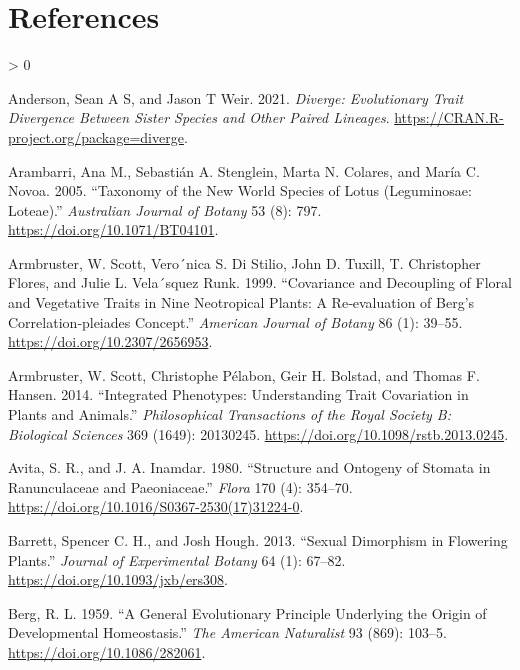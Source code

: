 \documentclass[
  10pt,
]{article}
\newlength{\cslhangindent}
\newenvironment{CSLReferences}[2] %
 {%
  \setlength{\parindent}{0pt}
  \ifodd #1 \everypar{\setlength{\hangindent}{\cslhangindent}}\ignorespaces\fi
  \ifnum #2 > 0
  \setlength{\parskip}{#2\baselineskip}
  \fi
 }%
 {}
\begin{document}
\clearpage

\hypertarget{references}{%
\section*{References}\label{references}}

\hypertarget{refs}{}
\begin{CSLReferences}{1}{0}
\leavevmode\hypertarget{ref-anderson_diverge_2021}{}%
Anderson, Sean A S, and Jason T Weir. 2021. \emph{Diverge: {Evolutionary} {Trait} {Divergence} {Between} {Sister} {Species} and {Other} {Paired} {Lineages}}. \url{https://CRAN.R-project.org/package=diverge}.

\leavevmode\hypertarget{ref-arambarri_taxonomy_2005}{}%
Arambarri, Ana M., Sebastián A. Stenglein, Marta N. Colares, and María C. Novoa. 2005. {``Taxonomy of the {New} {World} Species of {Lotus} ({Leguminosae}: {Loteae}).''} \emph{Australian Journal of Botany} 53 (8): 797. \url{https://doi.org/10.1071/BT04101}.

\leavevmode\hypertarget{ref-armbruster_covariance_1999}{}%
Armbruster, W. Scott, Vero´nica S. Di Stilio, John D. Tuxill, T. Christopher Flores, and Julie L. Vela´squez Runk. 1999. {``Covariance and Decoupling of Floral and Vegetative Traits in Nine {Neotropical} Plants: A Re‐evaluation of {Berg}'s Correlation‐pleiades Concept.''} \emph{American Journal of Botany} 86 (1): 39--55. \url{https://doi.org/10.2307/2656953}.

\leavevmode\hypertarget{ref-armbruster_integrated_2014}{}%
Armbruster, W. Scott, Christophe Pélabon, Geir H. Bolstad, and Thomas F. Hansen. 2014. {``Integrated Phenotypes: Understanding Trait Covariation in Plants and Animals.''} \emph{Philosophical Transactions of the Royal Society B: Biological Sciences} 369 (1649): 20130245. \url{https://doi.org/10.1098/rstb.2013.0245}.

\leavevmode\hypertarget{ref-avita_structure_1980}{}%
Avita, S. R., and J. A. Inamdar. 1980. {``Structure and {Ontogeny} of {Stomata} in {Ranunculaceae} and {Paeoniaceae}.''} \emph{Flora} 170 (4): 354--70. \url{https://doi.org/10.1016/S0367-2530(17)31224-0}.

\leavevmode\hypertarget{ref-barrett_sexual_2013}{}%
Barrett, Spencer C. H., and Josh Hough. 2013. {``Sexual Dimorphism in Flowering Plants.''} \emph{Journal of Experimental Botany} 64 (1): 67--82. \url{https://doi.org/10.1093/jxb/ers308}.

\leavevmode\hypertarget{ref-berg_general_1959}{}%
Berg, R. L. 1959. {``A {General} {Evolutionary} {Principle} {Underlying} the {Origin} of {Developmental} {Homeostasis}.''} \emph{The American Naturalist} 93 (869): 103--5. \url{https://doi.org/10.1086/282061}.


\end{CSLReferences}
\end{document}
